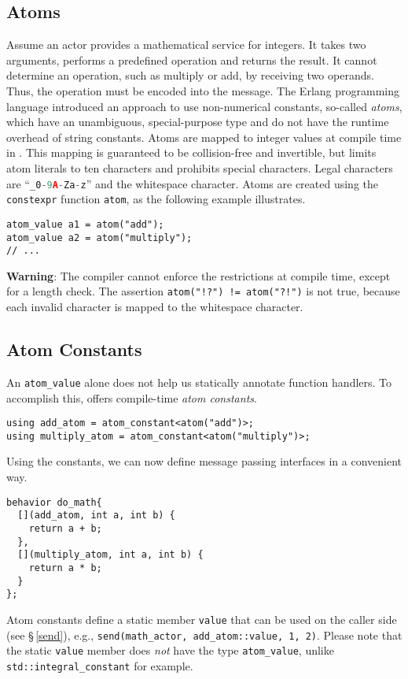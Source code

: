 \clearpage
\subsection{Atoms}
\label{atoms}

Assume an actor provides a mathematical service for integers.
It takes two arguments, performs a predefined operation and returns the result.
It cannot determine an operation, such as multiply or add, by receiving two operands.
Thus, the operation must be encoded into the message.
The Erlang programming language introduced an approach to use non-numerical
constants, so-called \textit{atoms}, which have an unambiguous, special-purpose type and do not have the runtime overhead of string constants.
Atoms are mapped to integer values at compile time in \lib.
This mapping is guaranteed to be collision-free and invertible, but limits atom literals to ten characters and prohibits special characters.
Legal characters are ``\lstinline[language=C++]^_0-9A-Za-z^'' and the whitespace character.
Atoms are created using the \lstinline^constexpr^ function \lstinline^atom^, as the following example illustrates.

\begin{lstlisting}
atom_value a1 = atom("add");
atom_value a2 = atom("multiply");
// ...
\end{lstlisting}

\textbf{Warning}: The compiler cannot enforce the restrictions at compile time, except for a length check.
The assertion \lstinline^atom("!?") != atom("?!")^ is not true, because each invalid character is mapped to the whitespace character.

\subsection{Atom Constants}

An \lstinline^atom_value^ alone does not help us statically annotate function handlers.
To accomplish this, \lib offers compile-time \emph{atom constants}.

\begin{lstlisting}
using add_atom = atom_constant<atom("add")>;
using multiply_atom = atom_constant<atom("multiply")>;
\end{lstlisting}

Using the constants, we can now define message passing interfaces in a convenient way.
\begin{lstlisting}
behavior do_math{
  [](add_atom, int a, int b) {
    return a + b;
  },
  [](multiply_atom, int a, int b) {
    return a * b;
  }
};
\end{lstlisting}

Atom constants define a static member \lstinline^value^ that can be used on the caller side (see \S\,\ref{send}), e.g., \lstinline^send(math_actor, add_atom::value, 1, 2)^.
Please note that the static \lstinline^value^ member does \emph{not} have the type \lstinline^atom_value^, unlike \lstinline^std::integral_constant^ for example.